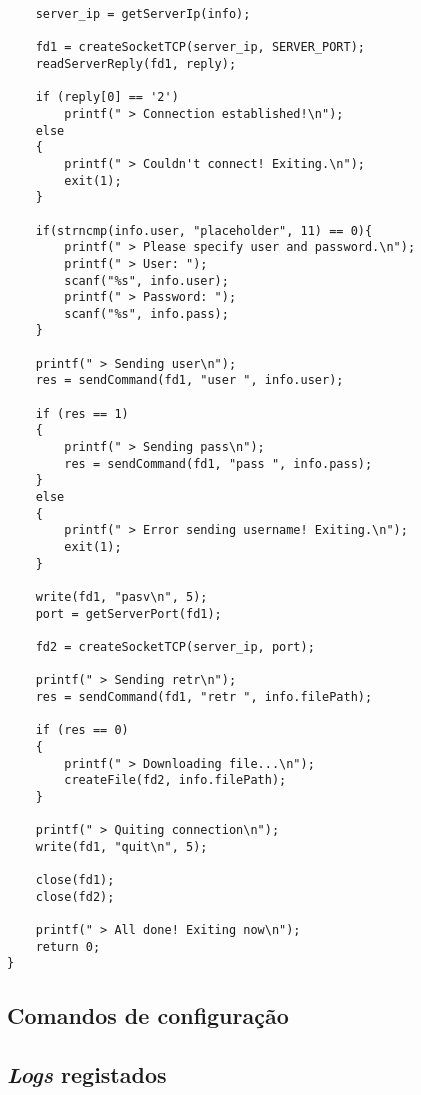 \documentclass{article}
\begin{document}
\begin{verbatim}
    server_ip = getServerIp(info);

    fd1 = createSocketTCP(server_ip, SERVER_PORT);
    readServerReply(fd1, reply);

    if (reply[0] == '2')
        printf(" > Connection established!\n");
    else
    {
        printf(" > Couldn't connect! Exiting.\n");
        exit(1);
    }

    if(strncmp(info.user, "placeholder", 11) == 0){
        printf(" > Please specify user and password.\n");
        printf(" > User: ");
        scanf("%s", info.user);
        printf(" > Password: ");
        scanf("%s", info.pass);
    }

    printf(" > Sending user\n");
    res = sendCommand(fd1, "user ", info.user);

    if (res == 1)
    {
        printf(" > Sending pass\n");
        res = sendCommand(fd1, "pass ", info.pass);
    }
    else
    {
        printf(" > Error sending username! Exiting.\n");
        exit(1);
    }

    write(fd1, "pasv\n", 5);
    port = getServerPort(fd1);

    fd2 = createSocketTCP(server_ip, port);

    printf(" > Sending retr\n");
    res = sendCommand(fd1, "retr ", info.filePath);

    if (res == 0)
    {
        printf(" > Downloading file...\n");
        createFile(fd2, info.filePath);
    }

    printf(" > Quiting connection\n");
    write(fd1, "quit\n", 5);

    close(fd1);
    close(fd2);

    printf(" > All done! Exiting now\n");
    return 0;
}
\end{verbatim}

\subsection{Comandos de configuração}
\subsection{\textit{Logs} registados}
\end{document}
